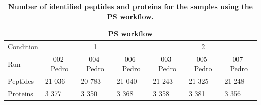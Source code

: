 \documentclass[11pt]{article}
\begin{document}
\begin{table}[h]
    \begin{tabular}{lllllll}
    \hline
    \multicolumn{7}{c}{PS workflow}                                                                                                                                                                                   \\ \hline
    Condition & \multicolumn{3}{c}{1}                                                                         & \multicolumn{3}{c}{2}                                                                         \\
    Run       & \multicolumn{1}{c}{002-Pedro} & \multicolumn{1}{c}{004-Pedro} & \multicolumn{1}{c}{006-Pedro} & \multicolumn{1}{c}{003-Pedro} & \multicolumn{1}{c}{005-Pedro} & \multicolumn{1}{c}{007-Pedro} \\
    Peptides  & 21 036                        & 20 783                        & 21 040                        & 21 243                        & 21 325                        & 21 248                        \\
    Proteins  & 3 377                         & 3 350                         & 3 368                         & 3 358                         & 3 381                         & 3 356                         \\ \hline
    \end{tabular}
     \caption{{\bf Number of identified peptides and proteins for the samples using the PS workflow.}
          \label{fig:diann_peptide_and_protein_id}}
\end{table}

\iffalse
\end{document}

